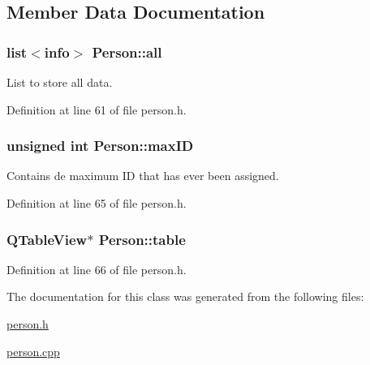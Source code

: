 \subsection{Member Data Documentation}
\hypertarget{class_person_a23d6ff8cb8e45c9e3502baffa6a0468a}{
\subsubsection[{all}]{\setlength{\rightskip}{0pt plus 5cm}list$<${\bf info}$>$ Person\+::all\hspace{0.3cm}{\ttfamily [private]}}}\label{class_person_a23d6ff8cb8e45c9e3502baffa6a0468a}


List to store all data. 



Definition at line 61 of file person.\+h.

\hypertarget{class_person_a816ee6194426eb703b61ae267e8e8ee6}{
\subsubsection[{max\+I\+D}]{\setlength{\rightskip}{0pt plus 5cm}unsigned int Person\+::max\+I\+D\hspace{0.3cm}{\ttfamily [private]}}}\label{class_person_a816ee6194426eb703b61ae267e8e8ee6}


Contains de maximum I\+D that has ever been assigned. 



Definition at line 65 of file person.\+h.

\hypertarget{class_person_aefba04c96d0d90ab2b220e6ad704c55a}{
\subsubsection[{table}]{\setlength{\rightskip}{0pt plus 5cm}Q\+Table\+View$\ast$ Person\+::table\hspace{0.3cm}{\ttfamily [private]}}}\label{class_person_aefba04c96d0d90ab2b220e6ad704c55a}


Definition at line 66 of file person.\+h.



The documentation for this class was generated from the following files\+:\begin{DoxyCompactItemize}
\item 
\hyperlink{person_8h}{person.\+h}\item 
\hyperlink{person_8cpp}{person.\+cpp}\end{DoxyCompactItemize}
